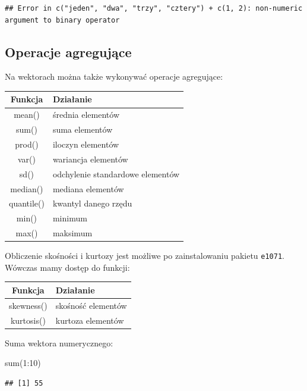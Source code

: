 \documentclass[
]{book}
\newenvironment{Shaded}{\begin{snugshade}}{\end{snugshade}}
\newcommand{\DecValTok}[1]{\textcolor[rgb]{0.00,0.00,0.81}{#1}}
\newcommand{\FunctionTok}[1]{\textcolor[rgb]{0.00,0.00,0.00}{#1}}
\newcommand{\NormalTok}[1]{#1}
\newcommand{\SpecialCharTok}[1]{\textcolor[rgb]{0.00,0.00,0.00}{#1}}
\begin{document}
\begin{verbatim}
## Error in c("jeden", "dwa", "trzy", "cztery") + c(1, 2): non-numeric argument to binary operator
\end{verbatim}

\hypertarget{operacje-agregujux105ce}{%
\subsection{Operacje agregujące}\label{operacje-agregujux105ce}}

Na wektorach można także wykonywać operacje agregujące:

\begin{longtable}[]{@{}cl@{}}
\toprule
Funkcja & Działanie \\
\midrule
\endhead
mean() & średnia elementów \\
sum() & suma elementów \\
prod() & iloczyn elementów \\
var() & wariancja elementów \\
sd() & odchylenie standardowe elementów \\
median() & mediana elementów \\
quantile() & kwantyl danego rzędu \\
min() & minimum \\
max() & maksimum \\
\bottomrule
\end{longtable}

Obliczenie skośności i kurtozy jest możliwe po zainstalowaniu pakietu \texttt{e1071}. Wówczas mamy dostęp do funkcji:

\begin{longtable}[]{@{}cl@{}}
\toprule
Funkcja & Działanie \\
\midrule
\endhead
skewness() & skośność elementów \\
kurtosis() & kurtoza elementów \\
\bottomrule
\end{longtable}

Suma wektora numerycznego:

\begin{Shaded}
\begin{Highlighting}[]
\FunctionTok{sum}\NormalTok{(}\DecValTok{1}\SpecialCharTok{:}\DecValTok{10}\NormalTok{)}
\end{Highlighting}
\end{Shaded}

\begin{verbatim}
## [1] 55
\end{verbatim}
\end{document}
